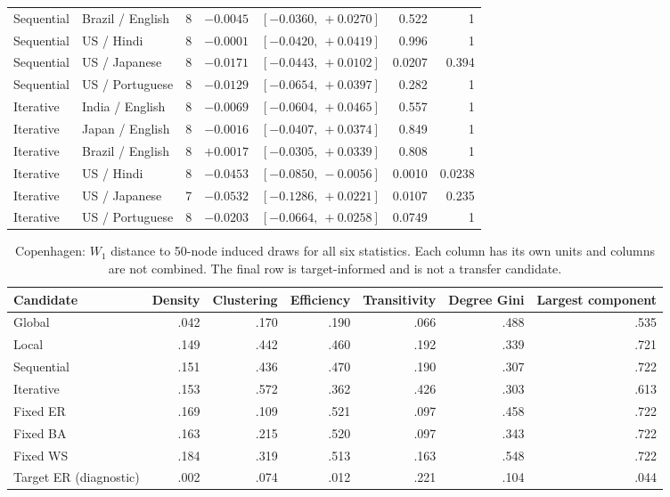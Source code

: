 \documentclass{article}
\begin{document}
\begin{table}[ht]
\begin{tabular}{llrrrrr}
Sequential & Brazil / English & 8 & $-0.0045$ & $[-0.0360,\ +0.0270]$ & 0.522 & 1 \\
Sequential & US / Hindi & 8 & $-0.0001$ & $[-0.0420,\ +0.0419]$ & 0.996 & 1 \\
Sequential & US / Japanese & 8 & $-0.0171$ & $[-0.0443,\ +0.0102]$ & 0.0207 & 0.394 \\
Sequential & US / Portuguese & 8 & $-0.0129$ & $[-0.0654,\ +0.0397]$ & 0.282 & 1 \\
\addlinespace
Iterative & India / English & 8 & $-0.0069$ & $[-0.0604,\ +0.0465]$ & 0.557 & 1 \\
Iterative & Japan / English & 8 & $-0.0016$ & $[-0.0407,\ +0.0374]$ & 0.849 & 1 \\
Iterative & Brazil / English & 8 & $+0.0017$ & $[-0.0305,\ +0.0339]$ & 0.808 & 1 \\
Iterative & US / Hindi & 8 & $-0.0453$ & $[-0.0850,\ -0.0056]$ & 0.0010 & 0.0238 \\
Iterative & US / Japanese & 7 & $-0.0532$ & $[-0.1286,\ +0.0221]$ & 0.0107 & 0.235 \\
Iterative & US / Portuguese & 8 & $-0.0203$ & $[-0.0664,\ +0.0258]$ & 0.0749 & 1 \\
\bottomrule\end{tabular}\end{table}

\begin{table}[ht]\centering
\caption{Copenhagen: $W_1$ distance to 50-node induced draws for all six statistics. Each column has its own units and columns are not combined. The final row is target-informed and is not a transfer candidate.}\label{tab:cns}
\small\begin{tabular}{lrrrrrr}\toprule Candidate & Density & Clustering & Efficiency & Transitivity & Degree Gini & Largest component\\\midrule
Global&.042&.170&.190&.066&.488&.535\\
Local&.149&.442&.460&.192&.339&.721\\
Sequential&.151&.436&.470&.190&.307&.722\\
Iterative&.153&.572&.362&.426&.303&.613\\
Fixed ER&.169&.109&.521&.097&.458&.722\\
Fixed BA&.163&.215&.520&.097&.343&.722\\
Fixed WS&.184&.319&.513&.163&.548&.722\\\midrule
Target ER (diagnostic)&.002&.074&.012&.221&.104&.044\\\bottomrule\end{tabular}\end{table}
\end{document}
